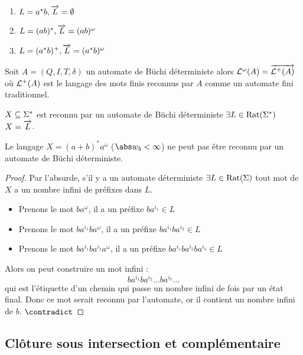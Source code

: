 \begin{exemple}
	\begin{enumerate}
		\item $L = a^*b, \overrightarrow{L} = \emptyset$
		\item $L = (ab)^*, \overrightarrow{L} = (ab)^{\omega}$
		\item $L = (a^*b)^+, \overrightarrow{L} =  (a^*b)^{\omega}$
	\end{enumerate}
\end{exemple}


\begin{prop}[Admis]
	Soit $A = (Q,I,T,\delta)$ un automate de Büchi déterministe alors $\mathcal{L}^{\omega} (A) = \overrightarrow{\mathcal{L}^+ (A)}$
	où $\mathcal{L}^+ (A)$ est le langage des mots finis reconnus par $A$ comme un automate fini traditionnel.
\end{prop}


\begin{coro}
	$X \subseteq \Sigma^{*}$ est reconnu par un automate de Büchi déterministe \ssi $\exists L \in \text{Rat}(\Sigma^{*})$
	\tq $X = \overrightarrow{L}$.
\end{coro}

\begin{prop}
	Le langage $X = (a+b)^*a^{\omega}$ ($ {\abs w}_b < \infty $) ne peut pas être reconnu par un automate de Büchi déterministe.
\end{prop}

\begin{proof}
	Par l'absurde, s'il y a un automate déterministe $\exists  L \in \text{Rat}(\Sigma)$ \tq tout mot de $X$ a un nombre infini de préfixes dans $L$.

	\begin{itemize}
		\item Prenons le mot $ba^{\omega}$, il a un préfixe $ba^{i_1} \in L$
		\item Prenons le mot $ba^{i_1}ba^{\omega}$, il a un préfixe $ba^{i_1}ba^{i_2} \in L$
		\item Prenons le mot $ba^{i_1}ba^{i_2}a^{\omega}$, il a un préfixe $ba^{i_1}ba^{i_2}ba^{i_3} \in L$
	\end{itemize}

	Alors on peut construire un mot infini :
	$$ ba^{i_1}ba^{i_2}\ldots ba^{i_k}\ldots$$
	qui est l'étiquette d'un chemin qui passe un nombre infini de fois par un état final.
	Donc ce mot serait reconnu par l'automate, or il contient un nombre infini de $b$.  $\contradict$
\end{proof}


\subsection{Clôture sous intersection et complémentaire}

